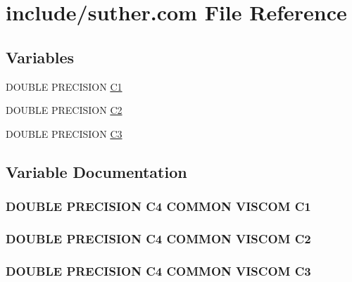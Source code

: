 \hypertarget{suther_8com}{\section{include/suther.com File Reference}
\label{suther_8com}
}
\subsection*{Variables}
\begin{DoxyCompactItemize}
\item 
D\-O\-U\-B\-L\-E P\-R\-E\-C\-I\-S\-I\-O\-N \hyperlink{suther_8com_ab5cd2bb7fe9bc6f4c3fbce5047b24fdd}{C1}
\item 
D\-O\-U\-B\-L\-E P\-R\-E\-C\-I\-S\-I\-O\-N \hyperlink{suther_8com_a3331bf2c79fcd00308bcc7b0cef16dbc}{C2}
\item 
D\-O\-U\-B\-L\-E P\-R\-E\-C\-I\-S\-I\-O\-N \hyperlink{suther_8com_aef24340798c9166836ba767a9170bf1a}{C3}
\end{DoxyCompactItemize}


\subsection{Variable Documentation}
\hypertarget{suther_8com_ab5cd2bb7fe9bc6f4c3fbce5047b24fdd}{
\subsubsection[{C1}]{\setlength{\rightskip}{0pt plus 5cm}D\-O\-U\-B\-L\-E P\-R\-E\-C\-I\-S\-I\-O\-N C4 C\-O\-M\-M\-O\-N V\-I\-S\-C\-O\-M C1}}\label{suther_8com_ab5cd2bb7fe9bc6f4c3fbce5047b24fdd}
\hypertarget{suther_8com_a3331bf2c79fcd00308bcc7b0cef16dbc}{
\subsubsection[{C2}]{\setlength{\rightskip}{0pt plus 5cm}D\-O\-U\-B\-L\-E P\-R\-E\-C\-I\-S\-I\-O\-N C4 C\-O\-M\-M\-O\-N V\-I\-S\-C\-O\-M C2}}\label{suther_8com_a3331bf2c79fcd00308bcc7b0cef16dbc}
\hypertarget{suther_8com_aef24340798c9166836ba767a9170bf1a}{
\subsubsection[{C3}]{\setlength{\rightskip}{0pt plus 5cm}D\-O\-U\-B\-L\-E P\-R\-E\-C\-I\-S\-I\-O\-N C4 C\-O\-M\-M\-O\-N V\-I\-S\-C\-O\-M C3}}\label{suther_8com_aef24340798c9166836ba767a9170bf1a}
